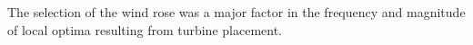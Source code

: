 	The selection of the wind rose was a major factor in the frequency and magnitude of local optima resulting from turbine placement.
